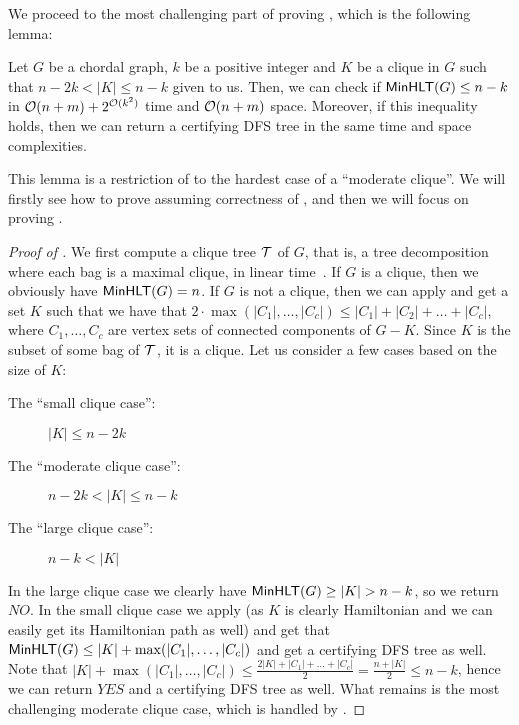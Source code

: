 \documentclass[a4paper,11pt]{article}
\begin{document}
We proceed to the most challenging part of proving , which is the following lemma:

\begin{lemma}\label{lem:moderate-case}
Let $G$ be a chordal graph, $k$ be a positive integer and $K$ be a clique in $G$ such that $n-2k<|K| \le n-k$ given to us. Then, we can check if $\mathsf{MinHLT}(G) \le n-k$ in ${\mathcal{O}}(n+m) + 2^{{\mathcal{O}}(k^2)}$ time and ${\mathcal{O}}(n + m)$ space.  Moreover, if this inequality holds, then we can return a certifying DFS tree in the same time and space complexities.
\end{lemma}

This lemma is a restriction of  to the hardest case of a ``moderate clique''. 
We will firstly see how to prove  assuming correctness of , and then we will focus on proving .

\begin{proof}[Proof of ]
We first compute a clique tree ${\mathcal{T}}$ of $G$, that is, a tree decomposition where each bag is a maximal clique, in linear time~\cite{LexBFS}.
If $G$ is a clique, then we obviously have $\mathsf{MinHLT}(G)=n$. If $G$ is not a clique, then we can apply  and get a set $K$ such that we have that $2 \cdot \max(|C_1|, \ldots, |C_c|) \le |C_1| + |C_2| + \ldots + |C_c|$, where $C_1, \ldots, C_c$ are vertex sets of connected components of $G-K$. 
Since $K$ is the subset of some bag of ${\mathcal{T}}$, it is a clique.
Let us consider a few cases based on the size of $K$:
\begin{description}
    \item[The ``small clique case'':] $|K| \le n-2k$
    \item[The ``moderate clique case'':] $n - 2k < |K| \le n - k$
    \item[The ``large clique case'':] $n-k<|K|$
\end{description}

In the large clique case we clearly have $\mathsf{MinHLT}(G) \ge |K| > n-k$, so we return $NO$.
%
In the small clique case we apply  (as $K$ is clearly Hamiltonian and we can easily get its Hamiltonian path as well) and get that $\mathsf{MinHLT}(G) \le |K| + \max(|C_1|, \ldots, |C_c|)$ and get a certifying DFS tree as well. Note that $|K| + \max(|C_1|, \ldots, |C_c|) \le \frac{2|K| + |C_1| + \ldots + |C_c|}{2} = \frac{n + |K|}{2} \le n-k$, hence we can return $YES$ and a certifying DFS tree as well.
%
What remains is the most challenging moderate clique case, which is handled by .
\end{proof}
\end{document}
